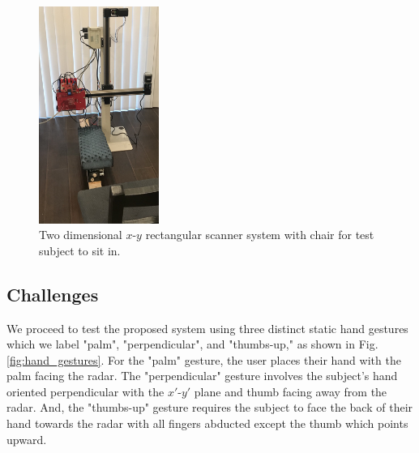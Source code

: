 \documentclass{ieeeaccess}
\begin{document}
\begin{figure}[h]
    \centering
    \includegraphics[width=0.35\textwidth]{scanner_photo.jpg}
    \caption{Two dimensional $x$-$y$ rectangular scanner system with chair for test subject to sit in.}
    \label{fig:xy_scanner_pic}
\end{figure}

\subsection{Challenges}
\label{subsec:challenges}
We proceed to test the proposed system using three distinct static hand gestures which we label "palm", "perpendicular", and "thumbs-up," as shown in Fig. \ref{fig:hand_gestures}. For the "palm" gesture, the user places their hand with the palm facing the radar. The "perpendicular" gesture involves the subject's hand oriented perpendicular with the $x'$-$y'$ plane and thumb facing away from the radar. And, the "thumbs-up" gesture requires the subject to face the back of their hand towards the radar with all fingers abducted except the thumb which points upward. 
\end{document}
